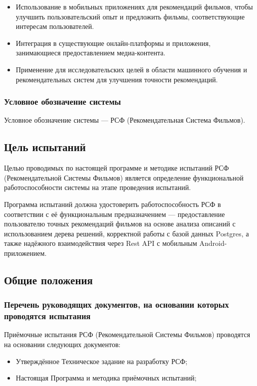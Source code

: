 \begin{itemize}
	\item Использование в мобильных приложениях для рекомендаций фильмов, чтобы улучшить пользовательский опыт и предложить фильмы, соответствующие интересам пользователей.
	\item Интеграция в существующие онлайн-платформы и приложения, занимающиеся предоставлением медиа-контента.
	\item Применение для исследовательских целей в области машинного обучения и рекомендательных систем для улучшения точности рекомендаций.
\end{itemize}

\subsubsection{Условное обозначение системы}

Условное обозначение системы — РСФ (Рекомендательная Система Фильмов).

\subsection{Цель испытаний}

Целью проводимых по настоящей программе и методике испытаний РСФ (Рекомендательной Системы Фильмов) является определение функциональной работоспособности системы на этапе проведения испытаний.

Программа испытаний должна удостоверить работоспособность РСФ в соответствии с её функциональным предназначением — предоставление пользователю точных рекомендаций фильмов на основе анализа описаний с использованием дерева решений, корректной работы с базой данных Postgres, а также надёжного взаимодействия через Rest API с мобильным Android-приложением.

\subsection{Общие положения}

\subsubsection{Перечень руководящих документов, на основании которых проводятся испытания}

Приёмочные испытания РСФ (Рекомендательной Системы Фильмов) проводятся на основании следующих документов:

\begin{itemize}
	\item Утверждённое Техническое задание на разработку РСФ;
	\item Настоящая Программа и методика приёмочных испытаний;
\end{itemize}

